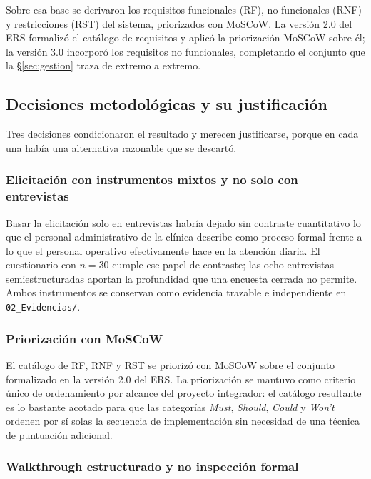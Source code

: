 Sobre esa base se derivaron los requisitos funcionales (RF), no funcionales (RNF) y restricciones
(RST) del sistema, priorizados con MoSCoW. La versión 2.0 del ERS formalizó el catálogo de requisitos
y aplicó la priorización MoSCoW sobre él; la versión 3.0 incorporó los requisitos no funcionales,
completando el conjunto que la \S\ref{sec:gestion} traza de extremo a extremo.
 
\subsection{Decisiones metodológicas y su justificación}
 
Tres decisiones condicionaron el resultado y merecen justificarse, porque en cada una había una
alternativa razonable que se descartó.
 
\subsubsection*{Elicitación con instrumentos mixtos y no solo con entrevistas}
 
Basar la elicitación solo en entrevistas habría dejado sin contraste cuantitativo lo que el personal
administrativo de la clínica describe como proceso formal frente a lo que el personal operativo
efectivamente hace en la atención diaria. El cuestionario con $n=30$ cumple ese papel de contraste;
las ocho entrevistas semiestructuradas aportan la profundidad que una encuesta cerrada no permite.
Ambos instrumentos se conservan como evidencia trazable e independiente en \texttt{02\_Evidencias/}.
 
\subsubsection*{Priorización con MoSCoW}
 
El catálogo de RF, RNF y RST se priorizó con MoSCoW sobre el conjunto formalizado en la versión 2.0
del ERS. La priorización se mantuvo como criterio único de ordenamiento por alcance del proyecto
integrador: el catálogo resultante es lo bastante acotado para que las categorías \emph{Must},
\emph{Should}, \emph{Could} y \emph{Won't} ordenen por sí solas la secuencia de implementación sin
necesidad de una técnica de puntuación adicional.
 
\subsubsection*{Walkthrough estructurado y no inspección formal}
 

